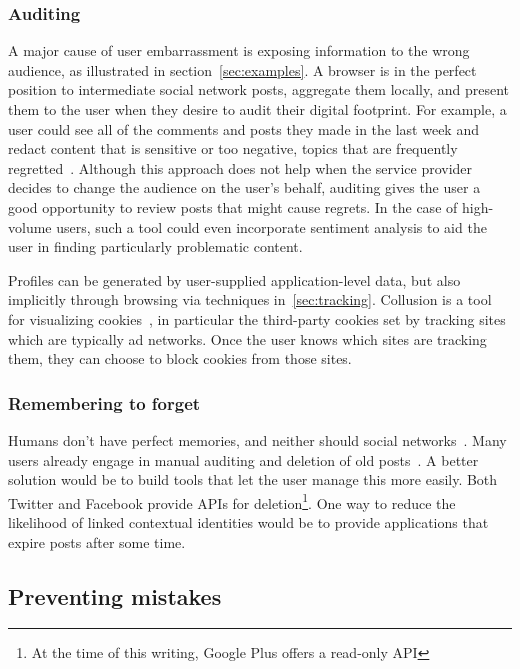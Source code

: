 \documentclass{llncs}
\begin{document}
\subsubsection{Auditing}
A major cause of user embarrassment is exposing information to the wrong
audience, as illustrated in section~\ref{sec:examples}. A browser is in the
perfect position to intermediate social network posts, aggregate them locally,
and present them to the user when they desire to audit their digital footprint.
For example, a user could see all of the comments and posts they made in the
last week and redact content that is sensitive or too negative, topics that are
frequently regretted~\cite{wang}. Although this approach does not help when the
service provider decides to change the audience on the user's behalf, auditing
gives the user a good opportunity to review posts that might cause
regrets. In the case of high-volume users, such a tool could even incorporate
sentiment analysis to aid the user in finding particularly problematic content.

Profiles can be generated by user-supplied application-level data, but also
implicitly through browsing via techniques in~\ref{sec:tracking}. Collusion is a
tool for visualizing cookies~\cite{collusion}, in particular the third-party
cookies set by tracking sites which are typically ad networks.  Once the user
knows which sites are tracking them, they can choose to block cookies from
those sites.

\subsubsection{Remembering to forget}
Humans don't have perfect memories, and neither should social
networks~\cite{delete}. Many users already engage in manual auditing and
deletion of old posts~\cite{fbtips2}. A better solution would be to build tools
that let the user manage this more easily. Both Twitter and Facebook provide
APIs for deletion\footnote{At the time of this writing, Google Plus offers a
read-only API}. One way to reduce the likelihood of linked contextual
identities would be to provide applications that expire posts after some time.

\begin{comment}
\cite{viegas}blogger's expectation of privacy
\end{comment}

\subsection{Preventing mistakes}
\end{document}
